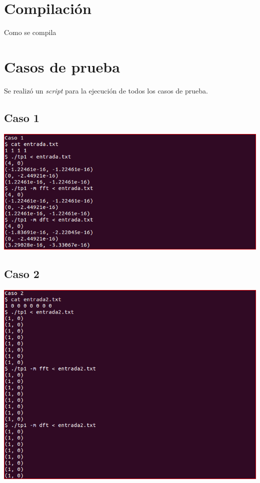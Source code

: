 \documentclass{article}
\begin{document}
\section{Compilación}
Como se compila

\section{Casos de prueba}

Se realizó un \textit{script} para la ejecución de todos los casos de prueba.
 \par
  \subsection{Caso 1}
    \begin{center}
      \includegraphics[width=0.8\paperwidth]{Imagenes/caso_1}
    \end{center}
  \subsection{Caso 2}
    \begin{center}
      \includegraphics[width=0.8\paperwidth]{Imagenes/caso_2}
    \end{center}
\end{document}
